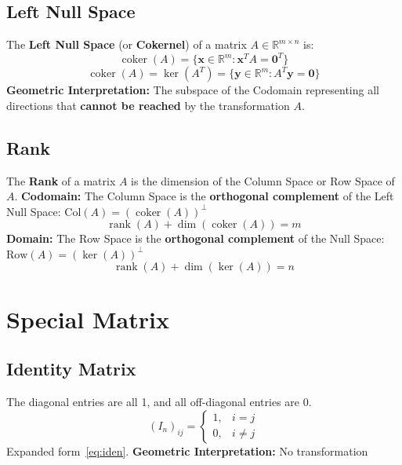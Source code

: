 \documentclass{article}
\begin{document}
\subsection{Left Null Space}
The \textbf{Left Null Space} (or \textbf{Cokernel}) of a matrix $A \in \mathbb{R}^{m \times n}$ is:
\[
    \operatorname{coker}(A) = \{ \mathbf{x} \in \mathbb{R}^m : \mathbf{x}^T A = \mathbf{0}^T \}
\]
\[
    \operatorname{coker}(A) = \ker(A^T) = \{ \mathbf{y} \in \mathbb{R}^m : A^T \mathbf{y} = \mathbf{0} \}
\]
\textbf{Geometric Interpretation:} The subspace of the Codomain representing all directions that \textbf{cannot be reached} by the transformation $A$.

\subsection{Rank}
The \textbf{Rank} of a matrix $A$ is the dimension of the Column Space or Row Space of $A$.
\newline
\textbf{Codomain:}
\newline
The Column Space is the \textbf{orthogonal complement} of the Left Null Space: $\text{Col}(A) = (\operatorname{coker}(A))^{\perp}$
\[
    \operatorname{rank}(A) + \dim(\operatorname{coker}(A)) = m
\]
\textbf{Domain:}
\newline
The Row Space is the \textbf{orthogonal complement} of the Null Space: $\text{Row}(A) = (\ker(A))^{\perp}$
\[
    \operatorname{rank}(A) + \dim(\ker(A)) = n
\]


\newpage
\section{Special Matrix}

\subsection{Identity Matrix}
The diagonal entries are all 1, and all off-diagonal entries are 0.
\[
    (I_n)_{ij} =
    \begin{cases}
        1, & i = j \\
        0, & i \neq j
    \end{cases}
\]
Expanded form~\ref{eq:iden}.
\newline
\textbf{Geometric Interpretation:} No transformation
\end{document}
